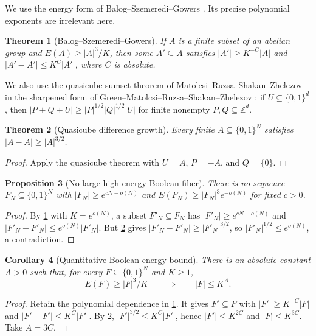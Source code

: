 \documentclass[11pt,a4paper]{amsart}
\numberwithin{equation}{section}
\newtheorem{theorem}{Theorem}[section]
\newtheorem{proposition}[theorem]{Proposition}
\newtheorem{corollary}[theorem]{Corollary}
\theoremstyle{remark}
\newcommand{\Z}{\mathbb Z}
\begin{document}
We use the energy form of Balog--Szemeredi--Gowers \cite{BalogSzemeredi,Gowers1998}.  Its precise polynomial exponents are irrelevant here.

\begin{theorem}[Balog--Szemeredi--Gowers]\label{thm:bsg}
If \(A\) is a finite subset of an abelian group and \(E(A)\ge |A|^3/K\), then some \(A'\subseteq A\) satisfies \(|A'|\ge K^{-C}|A|\) and \(|A'-A'|\le K^C|A'|\), where \(C\) is absolute.
\end{theorem}

We also use the quasicube sumset theorem of Matolcsi--Ruzsa--Shakan--Zhelezov \cite{MRSZ2020} in the sharpened form of Green--Matolcsi--Ruzsa--Shakan--Zhelezov \cite{GMRSZ2020}: if \(U\subseteq\{0,1\}^d\), then \(|P+Q+U|\ge |P|^{1/2}|Q|^{1/2}|U|\) for finite nonempty \(P,Q\subseteq\Z^d\).

\begin{theorem}[Quasicube difference growth]\label{thm:quasicube}
Every finite \(A\subseteq\{0,1\}^{N}\) satisfies \(|A-A|\ge |A|^{3/2}\).
\end{theorem}

\begin{proof}
Apply the quasicube theorem with \(U=A\), \(P=-A\), and \(Q=\{0\}\).
\end{proof}

\begin{proposition}[No large high-energy Boolean fiber]\label{prop:no-high-energy}
There is no sequence \(F_N\subseteq\{0,1\}^{N}\) with \(|F_N|\ge e^{cN-o(N)}\) and \(E(F_N)\ge |F_N|^3e^{-o(N)}\) for fixed \(c>0\).
\end{proposition}

\begin{proof}
By \cref{thm:bsg} with \(K=e^{o(N)}\), a subset \(F'_N\subseteq F_N\) has \(|F'_N|\ge e^{cN-o(N)}\) and \(|F'_N-F'_N|\le e^{o(N)}|F'_N|\).  But \cref{thm:quasicube} gives \(|F'_N-F'_N|\ge |F'_N|^{3/2}\), so \(|F'_N|^{1/2}\le e^{o(N)}\), a contradiction.
\end{proof}

\begin{corollary}[Quantitative Boolean energy bound]
\label{cor:quantitative-boolean-energy}
There is an absolute constant \(A>0\) such that, for every
\(F\subseteq\{0,1\}^N\) and \(K\ge1\),
\[
 E(F)\ge |F|^3/K\qquad\Longrightarrow\qquad |F|\le K^A.
\]
\end{corollary}

\begin{proof}
Retain the polynomial dependence in \cref{thm:bsg}.  It gives
\(F'\subseteq F\) with \(|F'|\ge K^{-C}|F|\) and
\(|F'-F'|\le K^C|F'|\).  By \cref{thm:quasicube},
\(|F'|^{3/2}\le K^C|F'|\), hence \(|F'|\le K^{2C}\) and
\(|F|\le K^{3C}\).  Take \(A=3C\).
\end{proof}
\end{document}
